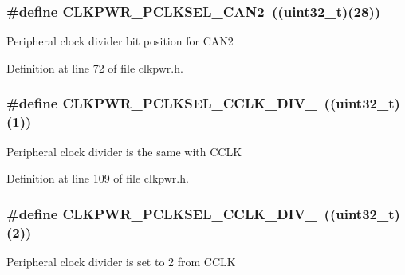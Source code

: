 \subsubsection[{\texorpdfstring{C\+L\+K\+P\+W\+R\+\_\+\+P\+C\+L\+K\+S\+E\+L\+\_\+\+C\+A\+N2}{CLKPWR_PCLKSEL_CAN2}}]{\setlength{\rightskip}{0pt plus 5cm}\#define C\+L\+K\+P\+W\+R\+\_\+\+P\+C\+L\+K\+S\+E\+L\+\_\+\+C\+A\+N2~(({\bf uint32\+\_\+t})(28))}\hypertarget{group___c_l_k_p_w_r___public___macros_gabc314973cc2becbd8cfcf4f4813c6dd4}{}\label{group___c_l_k_p_w_r___public___macros_gabc314973cc2becbd8cfcf4f4813c6dd4}
Peripheral clock divider bit position for C\+A\+N2 

Definition at line 72 of file clkpwr.\+h.

\subsubsection[{\texorpdfstring{C\+L\+K\+P\+W\+R\+\_\+\+P\+C\+L\+K\+S\+E\+L\+\_\+\+C\+C\+L\+K\+\_\+\+D\+I\+V\+\_\+1}{CLKPWR_PCLKSEL_CCLK_DIV_1}}]{\setlength{\rightskip}{0pt plus 5cm}\#define C\+L\+K\+P\+W\+R\+\_\+\+P\+C\+L\+K\+S\+E\+L\+\_\+\+C\+C\+L\+K\+\_\+\+D\+I\+V\+\_~(({\bf uint32\+\_\+t})(1))}\hypertarget{group___c_l_k_p_w_r___public___macros_ga9aaf02f3090e8a9208d261c0f984c165}{}\label{group___c_l_k_p_w_r___public___macros_ga9aaf02f3090e8a9208d261c0f984c165}
Peripheral clock divider is the same with C\+C\+LK 

Definition at line 109 of file clkpwr.\+h.

\subsubsection[{\texorpdfstring{C\+L\+K\+P\+W\+R\+\_\+\+P\+C\+L\+K\+S\+E\+L\+\_\+\+C\+C\+L\+K\+\_\+\+D\+I\+V\+\_\+2}{CLKPWR_PCLKSEL_CCLK_DIV_2}}]{\setlength{\rightskip}{0pt plus 5cm}\#define C\+L\+K\+P\+W\+R\+\_\+\+P\+C\+L\+K\+S\+E\+L\+\_\+\+C\+C\+L\+K\+\_\+\+D\+I\+V\+\_~(({\bf uint32\+\_\+t})(2))}\hypertarget{group___c_l_k_p_w_r___public___macros_ga07e1e67993eb7f67f2b9bca8e7a1d8c8}{}\label{group___c_l_k_p_w_r___public___macros_ga07e1e67993eb7f67f2b9bca8e7a1d8c8}
Peripheral clock divider is set to 2 from C\+C\+LK 

